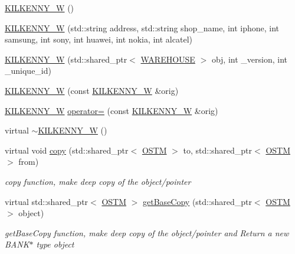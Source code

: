 \begin{DoxyCompactItemize}
\item 
\hyperlink{class_k_i_l_k_e_n_n_y___w_aee4c4b30bc934ff827f0851077b7fbab}{K\+I\+L\+K\+E\+N\+N\+Y\+\_\+W} ()
\item 
\hyperlink{class_k_i_l_k_e_n_n_y___w_a292872c50225002759ebe70be3c96a72}{K\+I\+L\+K\+E\+N\+N\+Y\+\_\+W} (std\+::string address, std\+::string shop\+\_\+name, int iphone, int samsung, int sony, int huawei, int nokia, int alcatel)
\item 
\hyperlink{class_k_i_l_k_e_n_n_y___w_a6df9a34ae732b0196391aceecf865089}{K\+I\+L\+K\+E\+N\+N\+Y\+\_\+W} (std\+::shared\+\_\+ptr$<$ \hyperlink{class_w_a_r_e_h_o_u_s_e}{W\+A\+R\+E\+H\+O\+U\+SE} $>$ obj, int \+\_\+version, int \+\_\+unique\+\_\+id)
\item 
\hyperlink{class_k_i_l_k_e_n_n_y___w_a370a1fb0d26d2b80da6e1101921d1564}{K\+I\+L\+K\+E\+N\+N\+Y\+\_\+W} (const \hyperlink{class_k_i_l_k_e_n_n_y___w}{K\+I\+L\+K\+E\+N\+N\+Y\+\_\+W} \&orig)
\item 
\hyperlink{class_k_i_l_k_e_n_n_y___w}{K\+I\+L\+K\+E\+N\+N\+Y\+\_\+W} \hyperlink{class_k_i_l_k_e_n_n_y___w_acff3cfb6cc15b4c4bc0dbe5685406393}{operator=} (const \hyperlink{class_k_i_l_k_e_n_n_y___w}{K\+I\+L\+K\+E\+N\+N\+Y\+\_\+W} \&orig)
\item 
virtual \hyperlink{class_k_i_l_k_e_n_n_y___w_a5b3f84f505c05449d9a7235f25ff3694}{$\sim$\+K\+I\+L\+K\+E\+N\+N\+Y\+\_\+W} ()
\item 
virtual void \hyperlink{class_k_i_l_k_e_n_n_y___w_a36a02e862f3563fbab3c94dfec4a0934}{copy} (std\+::shared\+\_\+ptr$<$ \hyperlink{class_o_s_t_m}{O\+S\+TM} $>$ to, std\+::shared\+\_\+ptr$<$ \hyperlink{class_o_s_t_m}{O\+S\+TM} $>$ from)
\begin{DoxyCompactList}\small\item\em copy function, make deep copy of the object/pointer \end{DoxyCompactList}\item 
virtual std\+::shared\+\_\+ptr$<$ \hyperlink{class_o_s_t_m}{O\+S\+TM} $>$ \hyperlink{class_k_i_l_k_e_n_n_y___w_ad8c5f7f6ac7689fa9acd6cafb0cb69a4}{get\+Base\+Copy} (std\+::shared\+\_\+ptr$<$ \hyperlink{class_o_s_t_m}{O\+S\+TM} $>$ object)
\begin{DoxyCompactList}\small\item\em get\+Base\+Copy function, make deep copy of the object/pointer and Return a new B\+A\+N\+K$\ast$ type object \end{DoxyCompactList}\item 

\end{DoxyCompactItemize}
